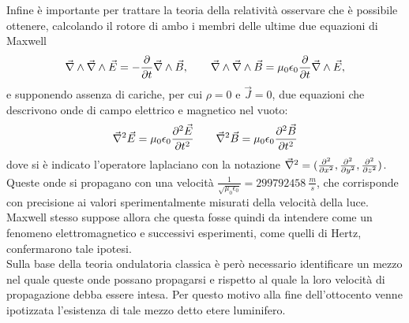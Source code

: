 Infine è importante per trattare la teoria della relatività osservare che è possibile ottenere, calcolando il rotore di ambo 
i membri delle ultime due equazioni di Maxwell
\begin{equation*}
	\vec{\nabla}\wedge\vec{\nabla}\wedge\vec{E}=-\frac{\partial}{\partial t}\vec{\nabla}\wedge\vec{B},
	\qquad \vec{\nabla}\wedge\vec{\nabla}\wedge\vec{B}=\mu_0\epsilon_0\frac{\partial}{\partial t}
	\vec{\nabla}\wedge\vec{E},
\end{equation*}
e supponendo assenza di cariche, per cui $\rho=0$ e $\vec{J}=0$, due equazioni che descrivono 
onde di campo elettrico e magnetico nel vuoto:
\begin{equation}
	\vec{\nabla}^2\vec{E}=\mu_0\epsilon_0\frac{\partial^2\vec{E}}{\partial t^2} \qquad \vec{\nabla}^2\vec{B}=
	\mu_0\epsilon_0\frac{\partial^2\vec{B}}{\partial t^2}
	\label{OndeEMVuoto}
\end{equation}
dove si è indicato l'operatore laplaciano con la notazione $\vec{\nabla}^2=(\frac{\partial^2 }{\partial x^2},\frac{\partial^2 }{\partial y^2},\frac{\partial^2 }{\partial z^2})$.\\
Queste onde si propagano con una velocità $\frac{1}{\sqrt{\mu_0\epsilon_0}}=299792458\  \frac{m}{s}$, 
che corrisponde con precisione ai valori sperimentalmente misurati della velocità della luce.\\ Maxwell stesso suppose allora che questa fosse quindi da intendere come un fenomeno elettromagnetico e successivi esperimenti, come quelli di Hertz, confermarono tale ipotesi.\\
Sulla base della teoria ondulatoria classica è però necessario identificare un mezzo nel quale queste onde possano 
propagarsi e rispetto al quale la loro velocità di propagazione debba essere intesa. Per questo motivo alla fine dell'ottocento venne ipotizzata l'esistenza di tale mezzo detto etere luminifero.